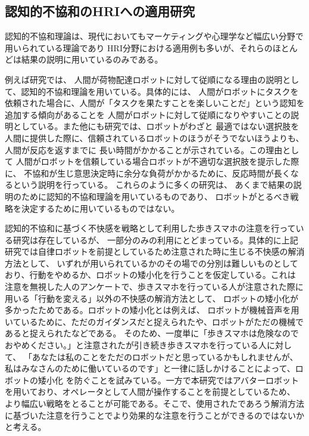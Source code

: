 \documentclass{kuisthesis}
\begin{document}
\subsection{認知的不協和のHRIへの適用研究}
認知的不協和理論\cite{Festinger1957}は、現代においてもマーケティングや心理学など幅広い分野で用いられている理論であり
HRI分野における適用例も多いが、それらのほとんどは結果の説明に用いているのみである。

例えば研究\cite{washburn2022exploring}では、
人間が荷物配達ロボットに対して従順になる理由の説明として、認知的不協和理論を用いている。具体的には、
人間がロボットにタスクを依頼された場合に、人間が「タスクを果たすことを楽しいことだ」という認知を追加する傾向があることを
人間がロボットに対して従順になりやすいことの説明としている。また他にも研究\cite{herse2018you}では、ロボットがわざと
最適ではない選択肢を人間に提供した際に、信頼されているロボットのほうがそうでないほうよりも、人間が反応を返すまでに
長い時間がかかることが示されている。この理由として
人間がロボットを信頼している場合ロボットが不適切な選択肢を提示した際に、
不協和が生じ意思決定時に余分な負荷がかかるために、反応時間が長くなるという説明を行っている。
これらのように多くの研究は、
あくまで結果の説明のために認知的不協和理論を用いているものであり、
ロボットがとるべき戦略を決定するために用いているものではない。

認知的不協和に基づく不快感を戦略として利用した歩きスマホの注意を行っている研究\cite{Schneider2022}は存在しているが、
一部分のみの利用にとどまっている。具体的に上記研究では自律ロボットを前提としているため注意された時に生じる不快感の解消方法として、
いずれが用いられているかのその場での分別は難しいものとしており、行動をやめるか、ロボットの矮小化を行うことを仮定している。これは
注意を無視した人のアンケートで、歩きスマホを行っている人が注意された際に用いる「行動を変える」以外の不快感の解消方法として、
ロボットの矮小化が多かったためである。ロボットの矮小化とは例えば、
ロボットが機械音声を用いているために、ただのガイダンスだと捉えられたや、ロボットがただの機械であると捉えられたなどである。
そのため、一度単に「歩きスマホは危険なのでおやめください。」と注意されたが引き続き歩きスマホを行っている人に対して、
「あなたは私のことをただのロボットだと思っているかもしれませんが、私はみなさんのために働いているのです」と一律に話しかけることによって、ロボットの矮小化
を防ぐことを試みている。一方で本研究ではアバターロボットを用いており、オペレータとして人間が操作することを前提としているため、
より幅広い戦略をとることが可能である。そこで、使用されたであろう解消方法に基づいた注意を行うことでより効果的な注意を行うことができるのではないかと考える。
\end{document}

